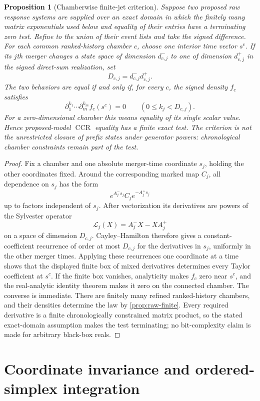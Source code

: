 \documentclass[11pt]{article}
\newtheorem{proposition}[theorem]{Proposition}
\newcommand{\CCR}{\operatorname{CCR}}
\begin{document}
\begin{proposition}[Chamberwise finite-jet criterion]
\label{prop:finite-jet}
Suppose two proposed raw response systems are supplied over an exact domain in which the finitely many matrix exponentials used below and equality of their entries have a terminating zero test.  Refine to the union of their event lists and take the signed difference.  For each common ranked-history chamber $c$, choose one interior time vector $s^c$.  If its $j$th merger changes a state space of dimension $d^-_{c,j}$ to one of dimension $d^+_{c,j}$ in the signed direct-sum realization, set
\[
D_{c,j}=d^-_{c,j}d^+_{c,j}.
\]
The two behaviors are equal if and only if, for every $c$, the signed density $f_c$ satisfies
\[
\partial_1^{k_1}\cdots\partial_m^{k_m}f_c(s^c)=0
\qquad(0\le k_j<D_{c,j}) .
\]
For a zero-dimensional chamber this means equality of its single scalar value.  Hence proposed-model $\CCR$ equality has a finite exact test.  The criterion is not the unrestricted closure of prefix states under generator powers: chronological chamber constraints remain part of the test.
\end{proposition}

\begin{proof}
Fix a chamber and one absolute merger-time coordinate $s_j$, holding the other coordinates fixed.  Around the corresponding marked map $C_j$, all dependence on $s_j$ has the form
\[
e^{A^-_js_j}C_je^{-A^+_js_j}
\]
up to factors independent of $s_j$.  After vectorization its derivatives are powers of the Sylvester operator
\[
\mathcal L_j(X)=A^-_jX-XA^+_j
\]
on a space of dimension $D_{c,j}$.  Cayley--Hamilton therefore gives a constant-coefficient recurrence of order at most $D_{c,j}$ for the derivatives in $s_j$, uniformly in the other merger times.  Applying these recurrences one coordinate at a time shows that the displayed finite box of mixed derivatives determines every Taylor coefficient at $s^c$.  If the finite box vanishes, analyticity makes $f_c$ zero near $s^c$, and the real-analytic identity theorem makes it zero on the connected chamber.  The converse is immediate.  There are finitely many refined ranked-history chambers, and their densities determine the law by \cref{prop:raw-finite}.  Every required derivative is a finite chronologically constrained matrix product, so the stated exact-domain assumption makes the test terminating; no bit-complexity claim is made for arbitrary black-box reals.
\end{proof}

\section{Coordinate invariance and ordered-simplex integration}
\label{sec:integration}
\end{document}
